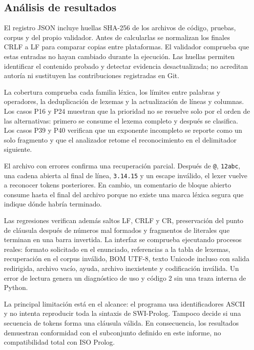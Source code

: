 \subsection{Análisis de resultados}

El registro JSON incluye huellas SHA-256 de los archivos de código, pruebas, corpus y del propio validador. Antes de calcularlas se normalizan los finales CRLF a LF para comparar copias entre plataformas. El validador comprueba que estas entradas no hayan cambiado durante la ejecución. Las huellas permiten identificar el contenido probado y detectar evidencia desactualizada; no acreditan autoría ni sustituyen las contribuciones registradas en Git.

La cobertura comprueba cada familia léxica, los límites entre palabras y operadores, la deduplicación de lexemas y la actualización de líneas y columnas. Los casos P16 y P24 muestran que la prioridad no se resuelve solo por el orden de las alternativas: primero se consume el lexema completo y después se clasifica. Los casos P39 y P40 verifican que un exponente incompleto se reporte como un solo fragmento y que el analizador retome el reconocimiento en el delimitador siguiente.

El archivo con errores confirma una recuperación parcial. Después de \texttt{@}, \texttt{12abc}, una cadena abierta al final de línea, \texttt{3.14.15} y un escape inválido, el lexer vuelve a reconocer tokens posteriores. En cambio, un comentario de bloque abierto consume hasta el final del archivo porque no existe una marca léxica segura que indique dónde habría terminado.

Las regresiones verifican además saltos LF, CRLF y CR, preservación del punto de cláusula después de números mal formados y fragmentos de literales que terminan en una barra invertida. La interfaz se comprueba ejecutando procesos reales: formato solicitado en el enunciado, referencias a la tabla de lexemas, recuperación en el corpus inválido, BOM UTF-8, texto Unicode incluso con salida redirigida, archivo vacío, ayuda, archivo inexistente y codificación inválida. Un error de lectura genera un diagnóstico de uso y código 2 sin una traza interna de Python.

La principal limitación está en el alcance: el programa usa identificadores ASCII y no intenta reproducir toda la sintaxis de SWI-Prolog. Tampoco decide si una secuencia de tokens forma una cláusula válida. En consecuencia, los resultados demuestran conformidad con el subconjunto definido en este informe, no compatibilidad total con ISO Prolog.
